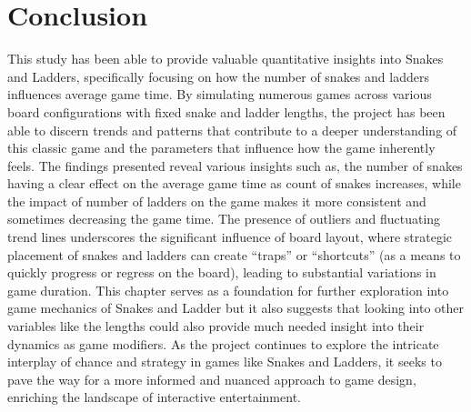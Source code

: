 \documentclass[12pt]{report}
\begin{document}
	\section{Conclusion}
	This study has been able to provide valuable quantitative insights into Snakes and Ladders, specifically focusing on how the number of snakes and ladders influences average game time. By simulating numerous games across various board configurations with fixed snake and ladder lengths, the project has been able to discern trends and patterns that contribute to a deeper understanding of this classic game and the parameters that influence how the game inherently feels. The findings presented reveal various insights such as, the number of snakes having a clear effect on the average game time as count of snakes increases, while the impact of number of ladders on the game makes it more consistent and sometimes decreasing the game time. The presence of outliers and fluctuating trend lines underscores the significant influence of board layout, where strategic placement of snakes and ladders can create ``traps'' or ``shortcuts'' (as a means to quickly progress or regress on the board), leading to substantial variations in game duration. This chapter serves as a foundation for further exploration into game mechanics of Snakes and Ladder but it also suggests that looking into other variables like the lengths could also provide much needed insight into their dynamics as game modifiers. As the project continues to explore the intricate interplay of chance and strategy in games like Snakes and Ladders, it seeks to pave the way for a more informed and nuanced approach to game design, enriching the landscape of interactive entertainment.	
\end{document}
